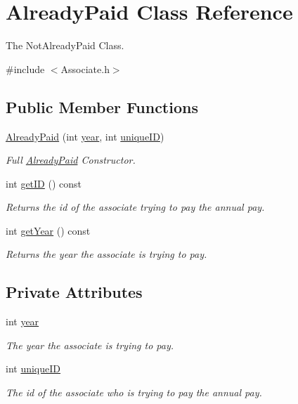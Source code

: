 \hypertarget{classAlreadyPaid}{}\section{Already\+Paid Class Reference}
\label{classAlreadyPaid}


The Not\+Already\+Paid Class.  




{\ttfamily \#include $<$Associate.\+h$>$}

\subsection*{Public Member Functions}
\begin{DoxyCompactItemize}
\item 
\mbox{\hyperlink{classAlreadyPaid_afa3ccdeb73e3570b346a4938a836a44e}{Already\+Paid}} (int \mbox{\hyperlink{classAlreadyPaid_aca0124c0c69671e1452020fc8697c3ca}{year}}, int \mbox{\hyperlink{classAlreadyPaid_ad5c108176759cfd9d2f9ca2dd143d843}{unique\+ID}})
\begin{DoxyCompactList}\small\item\em Full \mbox{\hyperlink{classAlreadyPaid}{Already\+Paid}} Constructor. \end{DoxyCompactList}\item 
int \mbox{\hyperlink{classAlreadyPaid_a54d1869f925f98bb8621131debf5f2c8}{get\+ID}} () const
\begin{DoxyCompactList}\small\item\em Returns the id of the associate trying to pay the annual pay. \end{DoxyCompactList}\item 
int \mbox{\hyperlink{classAlreadyPaid_a9bc932f3c57052ce0508abc48b5a5a6c}{get\+Year}} () const
\begin{DoxyCompactList}\small\item\em Returns the year the associate is trying to pay. \end{DoxyCompactList}\end{DoxyCompactItemize}
\subsection*{Private Attributes}
\begin{DoxyCompactItemize}
\item 
int \mbox{\hyperlink{classAlreadyPaid_aca0124c0c69671e1452020fc8697c3ca}{year}}
\begin{DoxyCompactList}\small\item\em The year the associate is trying to pay. \end{DoxyCompactList}\item 
int \mbox{\hyperlink{classAlreadyPaid_ad5c108176759cfd9d2f9ca2dd143d843}{unique\+ID}}
\begin{DoxyCompactList}\small\item\em The id of the associate who is trying to pay the annual pay. \end{DoxyCompactList}\end{DoxyCompactItemize}


